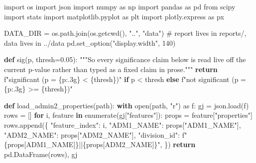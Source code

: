 \documentclass[
  letterpaper,
  DIV=11,
  numbers=noendperiod]{scrartcl}
\newenvironment{Shaded}{\begin{snugshade}}{\end{snugshade}}
\newcommand{\BuiltInTok}[1]{\textcolor[rgb]{0.00,0.23,0.31}{#1}}
\newcommand{\CommentTok}[1]{\textcolor[rgb]{0.37,0.37,0.37}{#1}}
\newcommand{\ControlFlowTok}[1]{\textcolor[rgb]{0.00,0.23,0.31}{\textbf{#1}}}
\newcommand{\DecValTok}[1]{\textcolor[rgb]{0.68,0.00,0.00}{#1}}
\newcommand{\FloatTok}[1]{\textcolor[rgb]{0.68,0.00,0.00}{#1}}
\newcommand{\ImportTok}[1]{\textcolor[rgb]{0.00,0.46,0.62}{#1}}
\newcommand{\KeywordTok}[1]{\textcolor[rgb]{0.00,0.23,0.31}{\textbf{#1}}}
\newcommand{\NormalTok}[1]{\textcolor[rgb]{0.00,0.23,0.31}{#1}}
\newcommand{\OperatorTok}[1]{\textcolor[rgb]{0.37,0.37,0.37}{#1}}
\newcommand{\SpecialCharTok}[1]{\textcolor[rgb]{0.37,0.37,0.37}{#1}}
\newcommand{\SpecialStringTok}[1]{\textcolor[rgb]{0.13,0.47,0.30}{#1}}
\newcommand{\StringTok}[1]{\textcolor[rgb]{0.13,0.47,0.30}{#1}}
\begin{document}
\begin{Shaded}
\begin{Highlighting}[]
\ImportTok{import}\NormalTok{ os}
\ImportTok{import}\NormalTok{ json}
\ImportTok{import}\NormalTok{ numpy }\ImportTok{as}\NormalTok{ np}
\ImportTok{import}\NormalTok{ pandas }\ImportTok{as}\NormalTok{ pd}
\ImportTok{from}\NormalTok{ scipy }\ImportTok{import}\NormalTok{ stats}
\ImportTok{import}\NormalTok{ matplotlib.pyplot }\ImportTok{as}\NormalTok{ plt}
\ImportTok{import}\NormalTok{ plotly.express }\ImportTok{as}\NormalTok{ px}

\NormalTok{DATA\_DIR }\OperatorTok{=}\NormalTok{ os.path.join(os.getcwd(), }\StringTok{".."}\NormalTok{, }\StringTok{"data"}\NormalTok{)  }\CommentTok{\# report lives in reports/, data lives in ../data}
\NormalTok{pd.set\_option(}\StringTok{"display.width"}\NormalTok{, }\DecValTok{140}\NormalTok{)}

\KeywordTok{def}\NormalTok{ sig(p, thresh}\OperatorTok{=}\FloatTok{0.05}\NormalTok{):}
    \CommentTok{"""So every significance claim below is read live off the current}
\CommentTok{    p{-}value rather than typed as a fixed claim in prose."""}
    \ControlFlowTok{return} \SpecialStringTok{f"significant (p = }\SpecialCharTok{\{}\NormalTok{p}\SpecialCharTok{:.3g\}}\SpecialStringTok{ \textless{} }\SpecialCharTok{\{}\NormalTok{thresh}\SpecialCharTok{\}}\SpecialStringTok{)"} \ControlFlowTok{if}\NormalTok{ p }\OperatorTok{\textless{}}\NormalTok{ thresh }\ControlFlowTok{else} \SpecialStringTok{f"not significant (p = }\SpecialCharTok{\{}\NormalTok{p}\SpecialCharTok{:.3g\}}\SpecialStringTok{ \textgreater{}= }\SpecialCharTok{\{}\NormalTok{thresh}\SpecialCharTok{\}}\SpecialStringTok{)"}

\KeywordTok{def}\NormalTok{ load\_admin2\_properties(path):}
    \ControlFlowTok{with} \BuiltInTok{open}\NormalTok{(path, }\StringTok{"r"}\NormalTok{) }\ImportTok{as}\NormalTok{ f:}
\NormalTok{        gj }\OperatorTok{=}\NormalTok{ json.load(f)}
\NormalTok{    rows }\OperatorTok{=}\NormalTok{ []}
    \ControlFlowTok{for}\NormalTok{ i, feature }\KeywordTok{in} \BuiltInTok{enumerate}\NormalTok{(gj[}\StringTok{"features"}\NormalTok{]):}
\NormalTok{        props }\OperatorTok{=}\NormalTok{ feature[}\StringTok{"properties"}\NormalTok{]}
\NormalTok{        rows.append(\{}
            \StringTok{"feature\_index"}\NormalTok{: i,}
            \StringTok{"ADM1\_NAME"}\NormalTok{: props[}\StringTok{"ADM1\_NAME"}\NormalTok{],}
            \StringTok{"ADM2\_NAME"}\NormalTok{: props[}\StringTok{"ADM2\_NAME"}\NormalTok{],}
            \StringTok{"division\_id"}\NormalTok{: }\SpecialStringTok{f"}\SpecialCharTok{\{}\NormalTok{props[}\StringTok{\textquotesingle{}ADM1\_NAME\textquotesingle{}}\NormalTok{]}\SpecialCharTok{\}}\SpecialStringTok{||}\SpecialCharTok{\{}\NormalTok{props[}\StringTok{\textquotesingle{}ADM2\_NAME\textquotesingle{}}\NormalTok{]}\SpecialCharTok{\}}\SpecialStringTok{"}\NormalTok{,}
\NormalTok{        \})}
    \ControlFlowTok{return}\NormalTok{ pd.DataFrame(rows), gj}


\end{Highlighting}
\end{Shaded}
\end{document}
